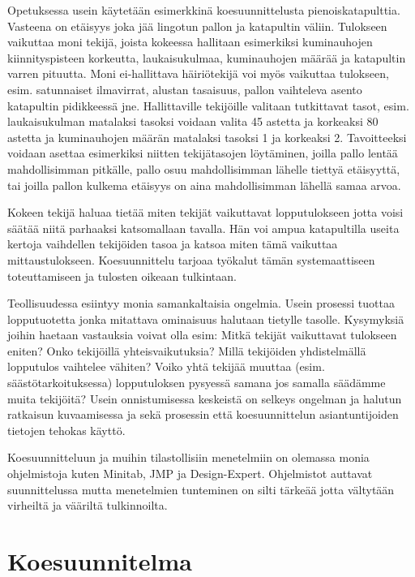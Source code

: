 \documentclass[12pt,a4paper,finnish]{tutthesis}
\begin{document}
Opetuksessa usein käytetään esimerkkinä koesuunnittelusta pienoiskatapulttia.
Vasteena on etäisyys joka jää lingotun pallon ja katapultin väliin. Tulokseen
vaikuttaa moni tekijä, joista kokeessa hallitaan esimerkiksi kuminauhojen
kiinnityspisteen korkeutta, laukaisukulmaa, kuminauhojen määrää ja katapultin
varren pituutta. Moni ei-hallittava häiriötekijä
voi myös vaikuttaa tulokseen, esim. satunnaiset ilmavirrat, alustan tasaisuus,
pallon vaihteleva asento katapultin pidikkeessä jne. Hallittaville tekijöille
valitaan tutkittavat tasot, esim. laukaisukulman matalaksi tasoksi voidaan
valita 45 astetta ja korkeaksi 80 astetta ja kuminauhojen määrän matalaksi
tasoksi 1 ja korkeaksi 2. Tavoitteeksi voidaan asettaa esimerkiksi niitten
tekijätasojen löytäminen, joilla pallo lentää mahdollisimman pitkälle,
pallo osuu mahdollisimman lähelle tiettyä etäisyyttä, tai joilla
pallon kulkema etäisyys on aina mahdollisimman lähellä samaa arvoa.


Kokeen tekijä haluaa tietää miten tekijät vaikuttavat lopputulokseen jotta voisi
säätää niitä parhaaksi katsomallaan tavalla. Hän voi ampua katapultilla
useita kertoja vaihdellen
tekijöiden tasoa ja katsoa miten tämä vaikuttaa mittaustulokseen. Koesuunnittelu
tarjoaa työkalut tämän systemaattiseen toteuttamiseen ja tulosten oikeaan
tulkintaan.

Teollisuudessa esiintyy monia samankaltaisia ongelmia. Usein prosessi tuottaa
lopputuotetta jonka mitattava ominaisuus halutaan tietylle tasolle.
Kysymyksiä joihin haetaan vastauksia voivat olla esim: Mitkä tekijät vaikuttavat
tulokseen eniten? Onko tekijöillä yhteisvaikutuksia? Millä tekijöiden yhdistelmällä
lopputulos vaihtelee vähiten? Voiko yhtä tekijää muuttaa (esim. säästötarkoituksessa)
lopputuloksen pysyessä samana jos samalla säädämme muita tekijöitä?
Usein onnistumisessa keskeistä on selkeys ongelman ja halutun ratkaisun
kuvaamisessa ja sekä prosessin että koesuunnittelun asiantuntijoiden tietojen
tehokas käyttö.


Koesuunnitteluun ja muihin tilastollisiin menetelmiin on olemassa monia ohjelmistoja
kuten Minitab, JMP ja Design-Expert. Ohjelmistot auttavat suunnittelussa
mutta menetelmien tunteminen on silti tärkeää jotta vältytään virheiltä
ja vääriltä tulkinnoilta.

\section{Koesuunnitelma}
\label{doe}
\end{document}
